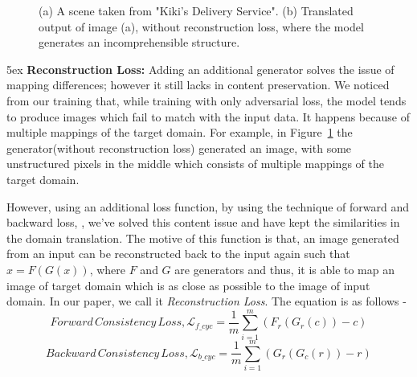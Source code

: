 \documentclass[runningheads]{llncs}
\begin{document}
\begin{figure}
\centering     %
{}
\hspace{0.1in}
\caption{(a) A scene taken from "Kiki's Delivery Service". (b) Translated output of image (a), without reconstruction loss, where the model generates an incomprehensible structure.}
\label{fig:rc_loss}
\end{figure}

\parindent 5ex \textbf{Reconstruction Loss:} Adding an additional generator solves the issue of mapping differences; however it still lacks in content preservation. We noticed from our training that, while training with only adversarial loss, the model tends to produce images which fail to match with the input data. It happens because of multiple mappings of the target domain. For example, in Figure~\ref{fig:rc_loss} the generator(without reconstruction loss) generated an image, with some unstructured pixels in the middle which consists of multiple mappings of the target domain.

However, using an additional loss function, by using the technique of forward and backward loss\cite{DBLP:conf/icml/KimCKLK17}, \cite{DBLP:conf/iccv/ZhuPIE17}, we've solved this content issue and have kept the similarities in the domain translation. The motive of this function is that, an image generated from an input can be reconstructed back to the input again such that $x = F(G(x))$, where $F$ and $G$ are generators and thus, it is able to map an image of target domain which is as close as possible to the image of input domain. In our paper, we call it \textit{Reconstruction Loss}. The equation is as follows - 
\begin{equation}
Forward\, Consistency\, Loss,\mathcal{L}_{f\_cyc} = \frac{1}{m} \sum^m_{i=1}(F_r(G_r(c)) - c)    
\end{equation}
\begin{equation}
Backward\, Consistency\, Loss,\mathcal{L}_{b\_cyc} = \frac{1}{m} \sum^m_{i=1}(G_r(G_c(r)) - r) 
\end{equation} 
\end{document}
